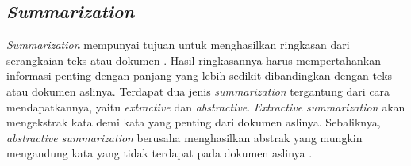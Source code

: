 \subsection{\textit{Summarization}}

\textit{Summarization} mempunyai tujuan untuk menghasilkan ringkasan dari serangkaian teks atau dokumen \parencite{summarization}. Hasil ringkasannya harus mempertahankan informasi penting dengan panjang yang lebih sedikit dibandingkan dengan teks atau dokumen aslinya. Terdapat dua jenis \textit{summarization} tergantung dari cara mendapatkannya, yaitu \textit{extractive} dan \textit{abstractive}. \textit{Extractive summarization} akan mengekstrak kata demi kata yang penting dari dokumen aslinya. Sebaliknya, \textit{abstractive summarization} berusaha menghasilkan abstrak yang mungkin mengandung kata yang tidak terdapat pada dokumen aslinya \parencite{summarization}.


